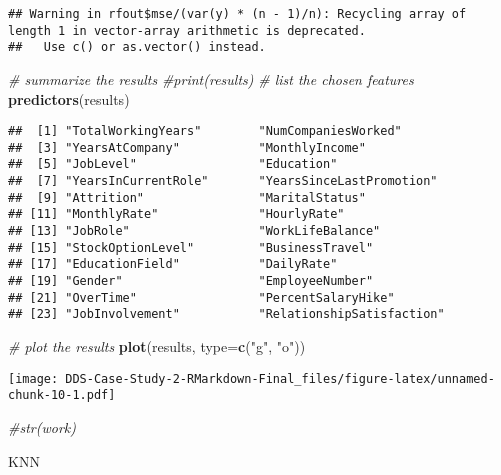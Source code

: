 \documentclass[]{article}
\newenvironment{Shaded}{\begin{snugshade}}{\end{snugshade}}
\newcommand{\CommentTok}[1]{\textcolor[rgb]{0.56,0.35,0.01}{\textit{#1}}}
\newcommand{\DataTypeTok}[1]{\textcolor[rgb]{0.13,0.29,0.53}{#1}}
\newcommand{\KeywordTok}[1]{\textcolor[rgb]{0.13,0.29,0.53}{\textbf{#1}}}
\newcommand{\NormalTok}[1]{#1}
\newcommand{\StringTok}[1]{\textcolor[rgb]{0.31,0.60,0.02}{#1}}
\begin{document}
\begin{verbatim}
## Warning in rfout$mse/(var(y) * (n - 1)/n): Recycling array of length 1 in vector-array arithmetic is deprecated.
##   Use c() or as.vector() instead.
\end{verbatim}

\begin{Shaded}
\begin{Highlighting}[]
\CommentTok{# summarize the results}
\CommentTok{#print(results)}
\CommentTok{# list the chosen features}
\KeywordTok{predictors}\NormalTok{(results)}
\end{Highlighting}
\end{Shaded}

\begin{verbatim}
##  [1] "TotalWorkingYears"        "NumCompaniesWorked"      
##  [3] "YearsAtCompany"           "MonthlyIncome"           
##  [5] "JobLevel"                 "Education"               
##  [7] "YearsInCurrentRole"       "YearsSinceLastPromotion" 
##  [9] "Attrition"                "MaritalStatus"           
## [11] "MonthlyRate"              "HourlyRate"              
## [13] "JobRole"                  "WorkLifeBalance"         
## [15] "StockOptionLevel"         "BusinessTravel"          
## [17] "EducationField"           "DailyRate"               
## [19] "Gender"                   "EmployeeNumber"          
## [21] "OverTime"                 "PercentSalaryHike"       
## [23] "JobInvolvement"           "RelationshipSatisfaction"
\end{verbatim}

\begin{Shaded}
\begin{Highlighting}[]
\CommentTok{# plot the results}
\KeywordTok{plot}\NormalTok{(results, }\DataTypeTok{type=}\KeywordTok{c}\NormalTok{(}\StringTok{"g"}\NormalTok{, }\StringTok{"o"}\NormalTok{))}
\end{Highlighting}
\end{Shaded}

\texttt{[image: DDS-Case-Study-2-RMarkdown-Final\_files/figure-latex/unnamed-chunk-10-1.pdf]}

\begin{Shaded}
\begin{Highlighting}[]
\CommentTok{#str(work)}
\end{Highlighting}
\end{Shaded}

KNN
\end{document}
